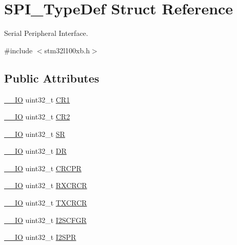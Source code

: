 \hypertarget{struct_s_p_i___type_def}{\section{S\-P\-I\-\_\-\-Type\-Def Struct Reference}
\label{struct_s_p_i___type_def}
}


Serial Peripheral Interface.  




{\ttfamily \#include $<$stm32l100xb.\-h$>$}

\subsection*{Public Attributes}
\begin{DoxyCompactItemize}
\item 
\hyperlink{core__sc300_8h_aec43007d9998a0a0e01faede4133d6be}{\-\_\-\-\_\-\-I\-O} uint32\-\_\-t \hyperlink{struct_s_p_i___type_def_a6ecd5cb63b85c381bd67dc90dd4f573a}{C\-R1}
\item 
\hyperlink{core__sc300_8h_aec43007d9998a0a0e01faede4133d6be}{\-\_\-\-\_\-\-I\-O} uint32\-\_\-t \hyperlink{struct_s_p_i___type_def_a38cb89a872e456e6ecd29b6c71d85600}{C\-R2}
\item 
\hyperlink{core__sc300_8h_aec43007d9998a0a0e01faede4133d6be}{\-\_\-\-\_\-\-I\-O} uint32\-\_\-t \hyperlink{struct_s_p_i___type_def_a33f3dd6a505d06fe6c466b63be451891}{S\-R}
\item 
\hyperlink{core__sc300_8h_aec43007d9998a0a0e01faede4133d6be}{\-\_\-\-\_\-\-I\-O} uint32\-\_\-t \hyperlink{struct_s_p_i___type_def_a02ef206dd5bb270e1f17fedd71284422}{D\-R}
\item 
\hyperlink{core__sc300_8h_aec43007d9998a0a0e01faede4133d6be}{\-\_\-\-\_\-\-I\-O} uint32\-\_\-t \hyperlink{struct_s_p_i___type_def_a609d2a279b1927846a991deb9d0dc0b0}{C\-R\-C\-P\-R}
\item 
\hyperlink{core__sc300_8h_aec43007d9998a0a0e01faede4133d6be}{\-\_\-\-\_\-\-I\-O} uint32\-\_\-t \hyperlink{struct_s_p_i___type_def_a60f1f0e77c52e89cfd738999bee5c9d0}{R\-X\-C\-R\-C\-R}
\item 
\hyperlink{core__sc300_8h_aec43007d9998a0a0e01faede4133d6be}{\-\_\-\-\_\-\-I\-O} uint32\-\_\-t \hyperlink{struct_s_p_i___type_def_a0b5a7f6383eb478bbcc22a36c5e95ae6}{T\-X\-C\-R\-C\-R}
\item 
\hyperlink{core__sc300_8h_aec43007d9998a0a0e01faede4133d6be}{\-\_\-\-\_\-\-I\-O} uint32\-\_\-t \hyperlink{struct_s_p_i___type_def_a4a1547c0ed26f31108910c35d2876b83}{I2\-S\-C\-F\-G\-R}
\item 
\hyperlink{core__sc300_8h_aec43007d9998a0a0e01faede4133d6be}{\-\_\-\-\_\-\-I\-O} uint32\-\_\-t \hyperlink{struct_s_p_i___type_def_aff2f386a2566c722f7962377b495f1a2}{I2\-S\-P\-R}
\end{DoxyCompactItemize}


